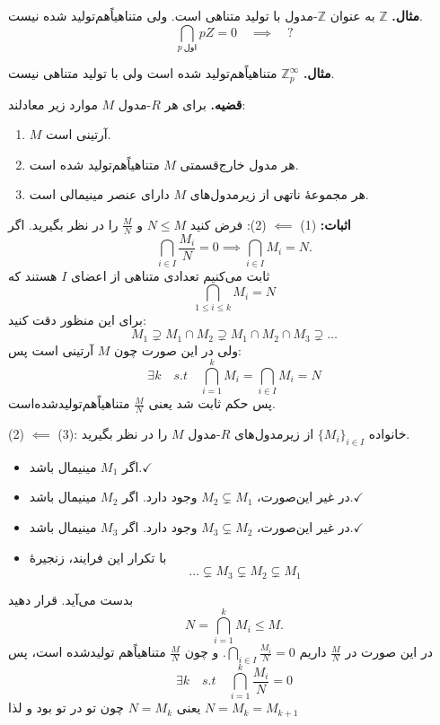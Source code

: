 \section{}

\textbf{مثال.} $\mathbb{Z}$ به عنوان $\mathbb{Z}$-مدول با تولید متناهی است.
ولی متناهیاًهم‌تولید شده نیست.
\[
    \bigcap_{p\ \text{اول}} pZ = 0 \quad \implies \quad ?
\]

\textbf{مثال.} $\mathbb{Z}_p^\infty$ متناهیاًهم‌تولید شده است ولی با تولید متناهی نیست.

\textbf{قضیه.} برای هر $R$-مدول $M$ موارد زیر معادلند:
\begin{enumerate}
    \item $M$ آرتینی است.
    \item هر مدول خارج‌قسمتی $M$
          متناهیاًهم‌تولید شده است.
    \item هر مجموعهٔ ناتهی از زیرمدول‌های $M$ دارای عنصر مینیمالی است.
\end{enumerate}

\textbf{اثبات:} (1) $\impliedby$ (2):
فرض کنید $N \leq M$ و $\frac{M}{N}$ را در نظر بگیرید. اگر
\[
    \bigcap_{i\in I} \frac{M_i}{N} = 0 \implies \bigcap_{i\in I} M_i = N.
\]
ثابت می‌کنیم تعدادی متناهی از اعضای
$I$
هستند که
\[
    \bigcap_{1 \leqslant i \leqslant k} M_i = N
\]
برای این منظور دقت کنید:
\[
    M_1 \supsetneq M_1 \cap M_2 \supsetneq M_1 \cap M_2 \cap M_3 \supsetneq \dots
\]
ولی در این صورت چون $M$ آرتینی است پس:
\[
    \exists k \quad s.t \quad \bigcap_{i=1}^k M_i = \bigcap_{i\in I} M_i = N
\]
پس حکم ثابت شد یعنی $\frac{M}{N}$ متناهیاًهم‌تولید‌شده‌است.


(2) $\impliedby$ (3):
خانواده $\{M_i\}_{i\in I}$ از زیرمدول‌های $R$-مدول $M$ را در نظر بگیرید.
\begin{itemize}
    \item [] اگر \(M_1\) مینیمال باشد.\(\checkmark\)
    \item [] در غیر این‌صورت، \(M_2 \subsetneq M_1\) وجود دارد. اگر \(M_2\) مینیمال باشد.\(\checkmark\)
    \item [] در غیر این‌صورت، \(M_3 \subsetneq M_2\) وجود دارد. اگر \(M_3\) مینیمال باشد.\(\checkmark\)
    \item [] با تکرار این فرایند،‌ زنجیرهٔ
          \[
              \dots  \subsetneq  M_3 \subsetneq M_2 \subsetneq M_1
          \]
\end{itemize}
بدست می‌آید. قرار دهید
\[
    N = \bigcap_{i=1}^k M_i \leqslant M.
\]
در این صورت در
\(\frac{M}{N}\)
داریم
\(\bigcap_{i \in I} \frac{M_i}{N} = 0\).
و چون
\(\frac{M}{N}\)
متناهیاًهم ‌تولیدشده است،‌ پس
\[
    \exists k \quad s.t \quad \bigcap_{i = 1}^{k} \frac{M_i}{N} = 0
\]
یعنی
\(N = M_k\)
چون تو در تو بود و لذا
\(N = M_k = M_{k+1}\)

